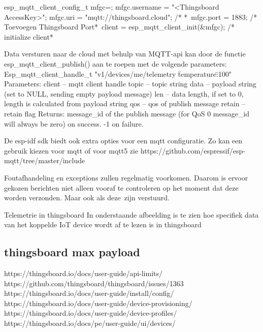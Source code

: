 		esp_mqtt_client_config_t mfgc={};
		mfgc.username = "<Thingsboard AccessKey>";
		mfgc.uri = "mqtt://thingsboard.cloud";  /* *\
		mfgc.port = 1883; /* Toevoegen Thingsboard Port*\  
		client = esp_mqtt_client_init(&mfgc);  /* initialize client*\
		
		\begin{center}
		\end{center}
		
		Data versturen naar de cloud met behulp van MQTT-api kan door de functie esp_mqtt_client_publish() aan te roepen met de volgende parameters:
		Esp_mqtt_client_handle_t
		"v1/devices/me/telemetry
		{\"temperature\":100}"
		Parameters:
		client – mqtt client handle
		topic – topic string
		data – payload string (set to NULL, sending empty payload message)
		len – data length, if set to 0, length is calculated from payload string
		qos – qos of publish message
		retain – retain flag
		Returns:
		message_id of the publish message (for QoS 0 message_id will always be zero) on success. -1 on failure.
		
		De esp-idf sdk biedt ook extra opties voor een mqtt configuratie. Zo kan een gebruik kiezen voor mqtt of voor mqtt5 zie https://github.com/espressif/esp-mqtt/tree/master/include
		
		
		Foutafhandeling en exceptions zullen regelmatig voorkomen. Daarom is ervoor gekozen berichten niet alleen vooraf te controleren op het moment dat deze worden verzonden. Maar ook als deze  zijn verstuurd. 
		
		
		
		\begin{center}
		\end{center}
		
		Telemetrie  in thingsboard 
		In onderstaande afbeelding is te zien hoe specifiek data van het koppelde IoT device wordt af te lezen is in thingsboard
		
		\subsection{thingsboard max payload}
		https://thingsboard.io/docs/user-guide/api-limits/
		https://github.com/thingsboard/thingsboard/issues/1363
		https://thingsboard.io/docs/user-guide/install/config/
		https://thingsboard.io/docs/user-guide/device-provisioning/
		https://thingsboard.io/docs/user-guide/device-profiles/
		https://thingsboard.io/docs/pe/user-guide/ui/devices/ 
		

